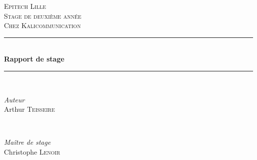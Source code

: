 \begin{titlepage}

\newcommand{\HRule}{\rule{\linewidth}{0.3mm}} %

\centering %


\textsc{\LARGE Epitech Lille}\\[1.5cm] %
\textsc{\Large Stage de deuxième année}\\[0.5cm] %
\textsc{\large Chez Kalicommunication}\\[0.5cm] %

\vspace*{1.5cm}


\HRule \\[0.4cm]
{ \huge \bfseries Rapport de stage}\\[0.4cm] %
\HRule \\[1.5cm]


\vspace*{0.5cm}
\begin{minipage}{0.4\textwidth}
\begin{flushleft} \large
\emph{Auteur}\\
Arthur \textsc{Teisseire} %
\end{flushleft}
\end{minipage}
~
\begin{minipage}{0.4\textwidth}
\begin{flushright} \large
\emph{Maître de stage} \\
Christophe \textsc{Lenoir} %
\end{flushright}
\end{minipage}\\[2cm]


\end{titlepage}
